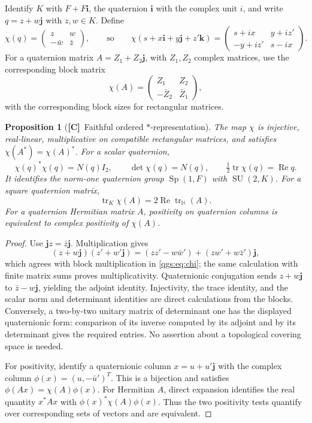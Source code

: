 \documentclass[11pt,oneside]{article}
\numberwithin{equation}{section}
\theoremstyle{plain}
\newtheorem{proposition}[proposition]{Proposition}
\theoremstyle{definition}
\theoremstyle{remark}
\newcommand{\HH}{\mathbb H}
\newcommand{\qi}{\mathbf i}
\newcommand{\qj}{\mathbf j}
\newcommand{\qk}{\mathbf k}
\DeclareMathOperator{\tr}{tr}
\DeclareMathOperator{\Rea}{Re}
\DeclareMathOperator{\SU}{SU}
\DeclareMathOperator{\Sp}{Sp}
\newcommand{\TC}{\textcolor{TierC}{\textsf{\bfseries[C]}}}
\begin{document}
Identify $K$ with $F+F\qi$, the quaternion $\qi$ with the complex unit $i$, and write $q=z+w\qj$ with $z,w\in K$. Define
\begin{equation}\label{qgs:eq:chi}
 \chi(q)=\begin{pmatrix}z&w\\-\bar w&\bar z\end{pmatrix},
 \qquad\text{so}\qquad
 \chi(s+x\qi+y\qj+z'\qk)=\begin{pmatrix}s+ix&y+iz'\\-y+iz'&s-ix\end{pmatrix}.
\end{equation}
For a quaternion matrix $A=Z_1+Z_2\qj$, with $Z_1,Z_2$ complex matrices, use the corresponding block matrix
\[
 \chi(A)=\begin{pmatrix}Z_1&Z_2\\-\bar Z_2&\bar Z_1\end{pmatrix},
\]
with the corresponding block sizes for rectangular matrices.

\begin{proposition}[\TC\ Faithful ordered $*$-representation]\label{qgs:prop:chi}
The map $\chi$ is injective, real-linear, multiplicative on compatible rectangular matrices, and satisfies $\chi(A^*)=\chi(A)^*$. For a scalar quaternion,
\[
 \chi(q)^*\chi(q)=N(q)I_2,\qquad
 \det\chi(q)=N(q),\qquad
 \tfrac12\tr\chi(q)=\Rea q.
\]
It identifies the norm-one quaternion group $\Sp(1,F)$ with $\SU(2,K)$. For a square quaternion matrix,
\begin{equation}\label{qgs:eq:quattrace}
 \tr_K\chi(A)=2\Rea\tr_{\HH}(A).
\end{equation}
For a quaternion Hermitian matrix $A$, positivity on quaternion columns is equivalent to complex positivity of $\chi(A)$.
\end{proposition}
\begin{proof}
Use $\qj z=\bar z\qj$. Multiplication gives
\[
 (z+w\qj)(z'+w'\qj)=(zz'-w\bar w')+(zw'+w\bar z')\qj,
\]
which agrees with block multiplication in \eqref{qgs:eq:chi}; the same calculation with finite matrix sums proves multiplicativity. Quaternionic conjugation sends $z+w\qj$ to $\bar z-w\qj$, yielding the adjoint identity. Injectivity, the trace identity, and the scalar norm and determinant identities are direct calculations from the blocks. Conversely, a two-by-two unitary matrix of determinant one has the displayed quaternionic form: comparison of its inverse computed by its adjoint and by its determinant gives the required entries. No assertion about a topological covering space is needed.

For positivity, identify a quaternionic column $x=u+u'\qj$ with the complex column $\phi(x)=(u,-\bar u')^T$. This is a bijection and satisfies $\phi(Ax)=\chi(A)\phi(x)$. For Hermitian $A$, direct expansion identifies the real quantity $x^*Ax$ with $\phi(x)^*\chi(A)\phi(x)$. Thus the two positivity tests quantify over corresponding sets of vectors and are equivalent.
\end{proof}
\end{document}

